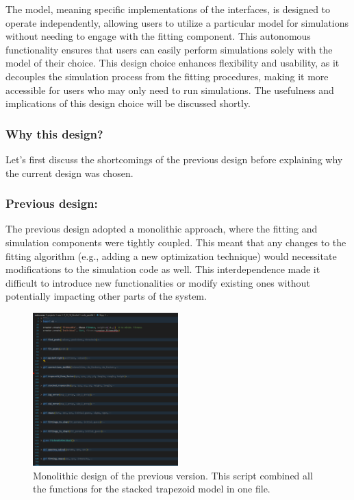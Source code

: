 \medskip

The model, meaning specific implementations of the interfaces, is designed to operate 
independently, allowing users to utilize a particular model
for simulations without needing to engage with the fitting component. This autonomous 
functionality ensures that users can easily perform simulations solely with the model of
 their choice. This design choice enhances flexibility and usability, as it decouples the simulation process from the fitting procedures, making it more accessible for users who may only need to run simulations.
The usefulness and implications of this design choice will be discussed shortly.


\subsubsection{Why this design?}
Let's first discuss the shortcomings of the previous design before explaining why the current design was chosen.

\subsubsection*{Previous design:}

The previous design adopted a monolithic approach, where the fitting and simulation components were tightly coupled. This meant that any changes to the fitting algorithm (e.g., adding a new optimization technique) would necessitate modifications to the simulation code as well. This interdependence made it difficult to introduce new functionalities or modify existing ones without potentially impacting other parts of the system.

\medskip

\begin{figure}[h]
    \centering
    \includegraphics[width=0.5\textwidth]{images/monolithic.png}
    \caption{Monolithic design of the previous version. This script combined all the functions for the stacked trapezoid model
     in one file.}
    \label{fig:monolithic_design}
\end{figure}

